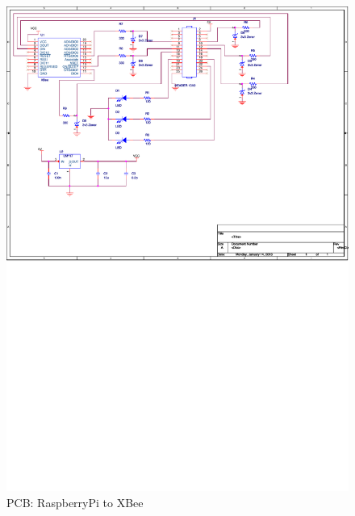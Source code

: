 \begin{figure}[H]
\begin{center}
\includegraphics{figures/Pi2XBee}
\end{center}
\caption{PCB: RaspberryPi to XBee}
\label{fig:Pi2XBee}
\end{figure}
